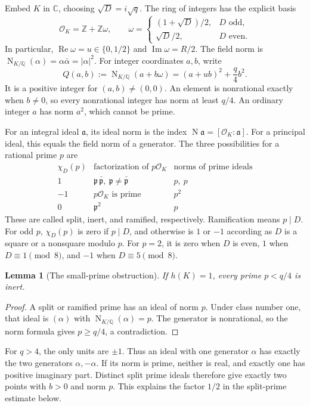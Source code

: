\documentclass[11pt]{article}
\newtheorem{lemma}[theorem]{Lemma}
\newcommand{\Z}{\mathbb Z}
\newcommand{\Q}{\mathbb Q}
\newcommand{\OK}{\mathcal O_K}
\begin{document}
Embed \(K\) in \(\mathbb C\), choosing \(\sqrt D=i\sqrt q\).
The ring of integers has the explicit basis
\[
 \OK=\Z+\Z\omega,\qquad
 \omega=\begin{cases}
 (1+\sqrt D)/2,&D\text{ odd},\\
 \sqrt D/2,&D\text{ even}.
 \end{cases}
\]
In particular, \(\operatorname{Re}\omega=u\in\{0,1/2\}\) and
\(\operatorname{Im}\omega=R/2\). The field norm is
\(\operatorname{N}_{K/\Q}(\alpha)=\alpha\bar\alpha=|\alpha|^2\).
For integer coordinates \(a,b\), write
\[
 Q(a,b):=\operatorname{N}_{K/\Q}(a+b\omega)
        =(a+ub)^2+\frac q4b^2.
\]
It is a positive integer for \((a,b)\ne(0,0)\). An element is
nonrational exactly when \(b\ne0\), so every nonrational integer
has norm at least \(q/4\). An ordinary integer \(a\) has norm \(a^2\),
which cannot be prime.

For an integral ideal \(\mathfrak a\), its ideal norm is the index
\(\operatorname{N}\mathfrak a=[\OK:\mathfrak a]\).
For a principal ideal, this equals the field norm of a generator.
The three possibilities for a rational prime \(p\) are
\[
\begin{array}{c|c|c}
 \chi_D(p)&\text{factorization of }p\OK&\text{norms of prime ideals}\\ \hline
 1&\mathfrak p\,\bar{\mathfrak p},\ \mathfrak p\ne\bar{\mathfrak p}
      &p,\ p\\
 -1&p\OK\text{ is prime}&p^2\\
 0&\mathfrak p^2&p
\end{array}
\]
These are called split, inert, and ramified, respectively. Ramification
means \(p\mid D\). For odd \(p\), \(\chi_D(p)\) is zero if \(p\mid D\),
and otherwise is \(1\) or \(-1\) according as \(D\) is a square or a
nonsquare modulo \(p\). For \(p=2\), it is zero when \(D\) is even,
\(1\) when \(D\equiv1\pmod8\), and \(-1\) when \(D\equiv5\pmod8\).

\begin{lemma}[The small-prime obstruction]\label{small-prime}
If \(h(K)=1\), every prime \(p<q/4\) is inert.
\end{lemma}
\begin{proof}
A split or ramified prime has an ideal of norm \(p\). Under class
number one, that ideal is \((\alpha)\) with
\(\operatorname{N}_{K/\Q}(\alpha)=p\). The generator is nonrational,
so the norm formula gives \(p\ge q/4\), a contradiction.
\end{proof}

For \(q>4\), the only units are \(\pm1\). Thus an ideal with one
generator \(\alpha\) has exactly the two generators \(\alpha,-\alpha\).
If its norm is prime, neither is real, and exactly one has positive
imaginary part. Distinct split prime ideals therefore give exactly two
points with \(b>0\) and norm \(p\). This explains the factor \(1/2\)
in the split-prime estimate below.
\end{document}
